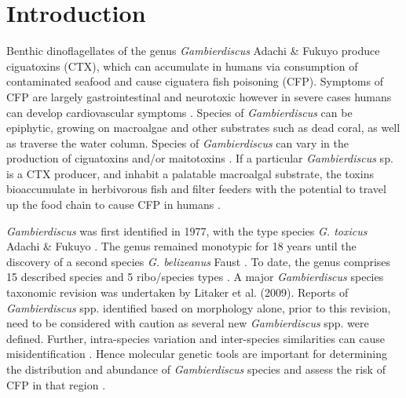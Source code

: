 \documentclass[12pt]{article}
\begin{document}
\newpage
\section*{Introduction}
Benthic dinoflagellates of the genus \emph{Gambierdiscus} Adachi \& Fukuyo produce ciguatoxins (CTX), which can accumulate in humans via consumption of contaminated seafood and cause ciguatera fish poisoning (CFP). Symptoms of CFP are largely gastrointestinal and neurotoxic however in severe cases humans can develop cardiovascular symptoms \citep{sims1987theoretical}. Species of \emph{Gambierdiscus} can be epiphytic, growing on macroalgae and other substrates such as dead coral, as well as traverse the water column. Species of \textit{Gambierdiscus} can vary in the production of ciguatoxins and/or maitotoxins \citep{chinain2010ciguatera,kohli2014high}. If a particular \emph{Gambierdiscus} sp. is a CTX producer, and inhabit a palatable macroalgal substrate, the toxins bioaccumulate in herbivorous fish and filter feeders with the potential to travel up the food chain to cause CFP in humans  \citep{chinain1997intraspecific,holmes1998gambierdiscus}. 

\emph{Gambierdiscus} was first identified in 1977, with the type species \emph{G. toxicus} Adachi \& Fukuyo \citep{adachi1979thecal}. The genus remained monotypic for 18 years until the discovery of a second species \emph{G. belizeanus} Faust \citep{faust1995observation}. To date, the genus comprises 15 described species and 5 ribo/species types
 \citep{smith2016new,fraga2016gambierdiscus,litaker2010global,adachi1979thecal,faust1995observation,chinain1999morphology,litaker2009taxonomy,dai2017taxonomic,nishimura2014morphology,rhodes2017new,kretzschmar2016characterization,fraga2011gambierdiscus,xu2014distribution,fraga2014genus} . %
A major \emph{Gambierdiscus} species taxonomic revision was undertaken by Litaker et al. (2009). Reports of \emph{Gambierdiscus} spp. identified based on morphology alone, prior to this revision, need to be considered with caution as several new \emph{Gambierdiscus} spp. were defined. Further, intra-species variation and inter-species similarities can cause misidentification \citep{bravo2014cellular,kretzschmar2016characterization,kohli2014high}. Hence molecular genetic tools are important for determining the distribution and abundance of  \textit{Gambierdiscus} species and assess the risk of CFP in that region \citep{kohli2014high,kretzschmar2016characterization}. \\
\end{document}
